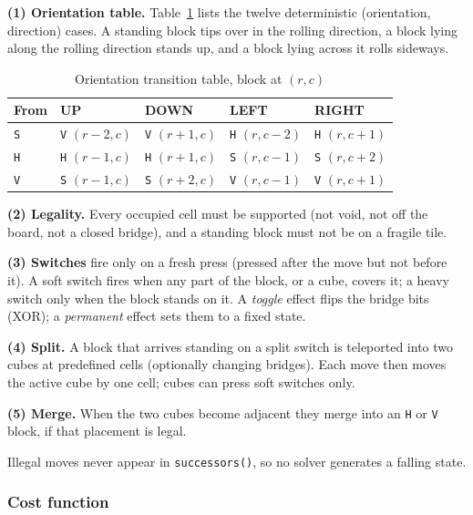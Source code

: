 \textbf{(1) Orientation table.} Table~\ref{tab:roll} lists the twelve deterministic
(orientation, direction) cases. A standing block tips over in the rolling direction, a block
lying along the rolling direction stands up, and a block lying across it rolls sideways.

\begin{table}[H]
\centering
\caption{Orientation transition table, block at $(r,c)$}
\label{tab:roll}
\begin{tabular}{lllll}
\toprule
\textbf{From} & \textbf{UP} & \textbf{DOWN} & \textbf{LEFT} & \textbf{RIGHT} \\
\midrule
\texttt{S} & \texttt{V} $(r-2,c)$ & \texttt{V} $(r+1,c)$ & \texttt{H} $(r,c-2)$ & \texttt{H} $(r,c+1)$ \\
\texttt{H} & \texttt{H} $(r-1,c)$ & \texttt{H} $(r+1,c)$ & \texttt{S} $(r,c-1)$ & \texttt{S} $(r,c+2)$ \\
\texttt{V} & \texttt{S} $(r-1,c)$ & \texttt{S} $(r+2,c)$ & \texttt{V} $(r,c-1)$ & \texttt{V} $(r,c+1)$ \\
\bottomrule
\end{tabular}
\end{table}

\textbf{(2) Legality.} Every occupied cell must be supported (not void, not off the board, not a
closed bridge), and a standing block must not be on a fragile tile.

\textbf{(3) Switches} fire only on a fresh press (pressed after the move but not before it).
A soft switch fires when any part of the block, or a cube, covers it; a heavy switch only when
the block stands on it. A \emph{toggle} effect flips the bridge bits (XOR); a \emph{permanent}
effect sets them to a fixed state.

\textbf{(4) Split.} A block that arrives standing on a split switch is teleported into two cubes
at predefined cells (optionally changing bridges). Each move then moves the active cube by one
cell; cubes can press soft switches only.

\textbf{(5) Merge.} When the two cubes become adjacent they merge into an \texttt{H} or
\texttt{V} block, if that placement is legal.

Illegal moves never appear in \texttt{successors()}, so no solver generates a falling state.

\subsubsection{Cost function}


